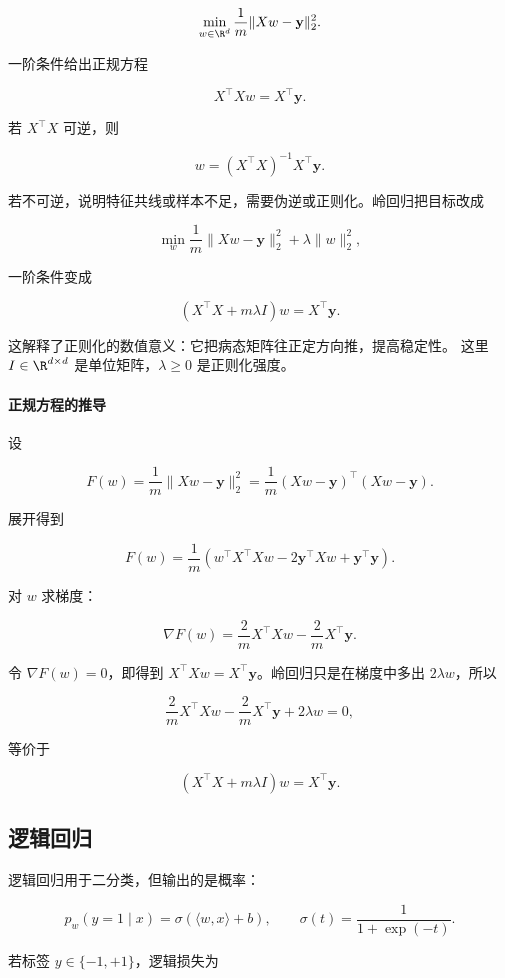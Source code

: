 \[
  \min_{w\in\R^d}
  \frac1m\|Xw-\mathbf{y}\|_2^2.
\]

一阶条件给出正规方程

\[
  X^\top Xw=X^\top \mathbf{y}.
\]

若 \(X^\top X\) 可逆，则

\[
  w=(X^\top X)^{-1}X^\top \mathbf{y}.
\]

若不可逆，说明特征共线或样本不足，需要伪逆或正则化。岭回归把目标改成

\[
  \min_w
  \frac1m\|Xw-\mathbf{y}\|_2^2+\lambda\|w\|_2^2,
\]

一阶条件变成

\[
  (X^\top X+m\lambda I)w=X^\top \mathbf{y}.
\]

这解释了正则化的数值意义：它把病态矩阵往正定方向推，提高稳定性。
这里 \(I\in\R^{d\times d}\) 是单位矩阵，\(\lambda\ge0\) 是正则化强度。

\paragraph{正规方程的推导}

设

\[
  F(w)=\frac1m\|Xw-\mathbf{y}\|_2^2
  =
  \frac1m(Xw-\mathbf{y})^\top(Xw-\mathbf{y}).
\]

展开得到

\[
  F(w)
  =
  \frac1m
  \left(
    w^\top X^\top Xw
    -
    2\mathbf{y}^\top Xw
    +
    \mathbf{y}^\top\mathbf{y}
  \right).
\]

对 \(w\) 求梯度：

\[
  \nabla F(w)
  =
  \frac{2}{m}X^\top Xw
  -
  \frac{2}{m}X^\top\mathbf{y}.
\]

令 \(\nabla F(w)=0\)，即得到 \(X^\top Xw=X^\top\mathbf{y}\)。岭回归只是在梯度中多出 \(2\lambda w\)，所以

\[
  \frac{2}{m}X^\top Xw
  -
  \frac{2}{m}X^\top\mathbf{y}
  +
  2\lambda w
  =
  0,
\]

等价于

\[
  (X^\top X+m\lambda I)w=X^\top\mathbf{y}.
\]

\subsection{逻辑回归}

逻辑回归用于二分类，但输出的是概率：

\[
  p_w(y=1\mid x)=\sigma(\langle w,x\rangle+b),
  \qquad
  \sigma(t)=\frac{1}{1+\exp(-t)}.
\]

若标签 \(y\in\{-1,+1\}\)，逻辑损失为

